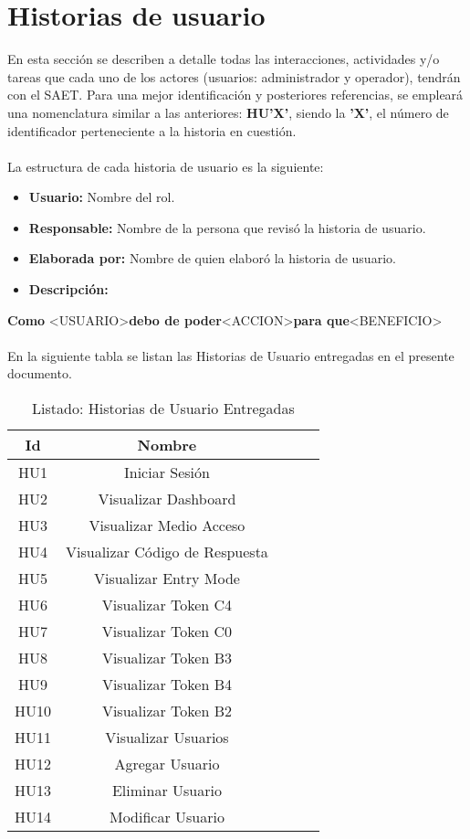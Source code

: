 \section{Historias de usuario}
En esta sección se describen a detalle todas las interacciones, actividades y/o tareas que cada uno de los actores (usuarios: administrador y operador), tendrán con el SAET. Para una mejor identificación y posteriores referencias, se empleará una nomenclatura similar a las anteriores: \textbf{HU'X'}, siendo la \textbf{'X'}, el número de identificador perteneciente a la historia en cuestión.
\\ \\
La estructura de cada historia de usuario es la siguiente: 
\begin{itemize}
	\item \textbf{Usuario:} Nombre del rol.
	\item \textbf{Responsable:} Nombre de la persona que revisó la historia de usuario.
	\item \textbf{Elaborada por:} Nombre de quien elaboró la historia de usuario.
	\item \textbf{Descripción:}
\end{itemize}
	\textbf{Como} \textless USUARIO\textgreater \textbf{debo de poder}\textless ACCION\textgreater \textbf{para que}\textless BENEFICIO\textgreater
	\\ \\
En la siguiente tabla se listan las Historias de Usuario entregadas en el presente documento.
\begin{table}[h]
	\begin{center}
		\begin{tabular}{|c|c|c|c|c|}
			\hline 
			\textbf{Id} & \textbf{Nombre} \\ 
			\hline 
			HU1 & Iniciar Sesión \\
			HU2 & Visualizar Dashboard \\
			HU3 & Visualizar Medio Acceso \\
			HU4 & Visualizar Código de Respuesta \\
			HU5 & Visualizar Entry Mode \\
			HU6 & Visualizar Token C4 \\
			HU7 & Visualizar Token C0 \\
			HU8 & Visualizar Token B3 \\
			HU9 & Visualizar Token B4 \\
			HU10 & Visualizar Token B2 \\
			HU11 & Visualizar Usuarios \\
			HU12 & Agregar Usuario \\
			HU13 & Eliminar Usuario \\
			HU14 & Modificar Usuario \\
			\hline 
		\end{tabular}
	\end{center}
	\caption{Listado: Historias de Usuario Entregadas}
\end{table}
